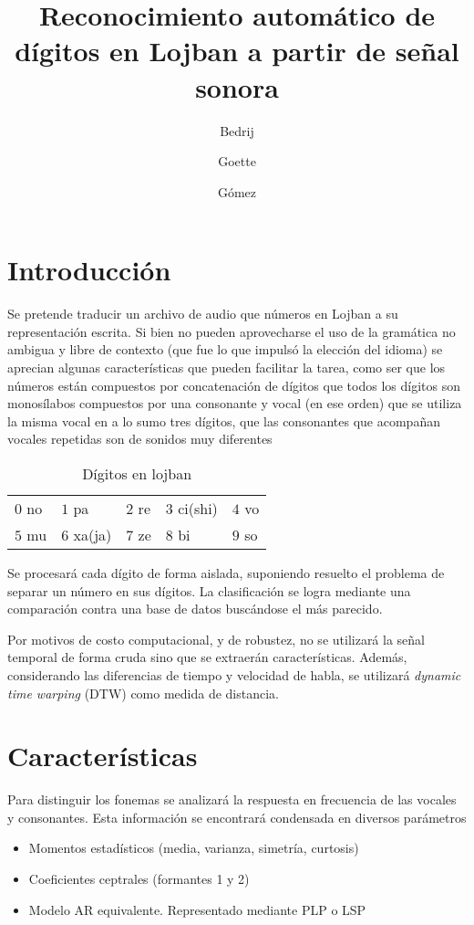 \documentclass[a4paper]{article}
\title{Reconocimiento automático de dígitos en Lojban a partir de señal sonora}
\author{Bedrij \and Goette \and Gómez}
\date{}
\begin{document}
	\maketitle
	\section{Introducción}
	Se pretende traducir un archivo de audio que números en Lojban
	a su representación escrita.
	Si bien no pueden aprovecharse el uso de la gramática
	no ambigua y libre de contexto (que fue lo que impulsó la
	elección del idioma) se aprecian algunas características que
	pueden facilitar la tarea, como ser que los números están
	compuestos por concatenación de dígitos que todos los dígitos
	son monosílabos compuestos por una consonante y vocal (en ese
	orden) que se utiliza la misma vocal en a lo sumo tres dígitos,
	que las consonantes que acompañan vocales repetidas son de
	sonidos muy diferentes

	\begin{table}[h]
		\center
		\begin{tabular}{lllll}
			$0$ no & $1$ pa & $2$ re & $3$ ci(shi) & $4$ vo\\
			$5$ mu & $6$ xa(ja) & $7$ ze & $8$ bi & $9$ so\\
		\end{tabular}
		\caption{Dígitos en lojban}
	\end{table}

	Se procesará cada dígito de forma aislada, suponiendo
	resuelto el problema de separar un número en sus dígitos.
	La clasificación se logra mediante una comparación contra una
	base de datos buscándose el más parecido.

	Por motivos de costo computacional, y de robustez, no se
	utilizará la señal temporal de forma cruda sino que se
	extraerán características.  Además, considerando las
	diferencias de tiempo y velocidad de habla, se utilizará
	\emph{dynamic time warping} (DTW) como medida de distancia.

	\section{Características}
		Para distinguir los fonemas se analizará la
		respuesta en frecuencia de las vocales y consonantes.
		Esta información se encontrará condensada en diversos
		parámetros %
			\begin{itemize} \itemsep0pt
				\item Momentos estadísticos (media, varianza, simetría, curtosis) 
				\item Coeficientes ceptrales (formantes 1 y 2) 
				\item Modelo AR equivalente. Representado mediante PLP o LSP
			\end{itemize}
\end{document}
